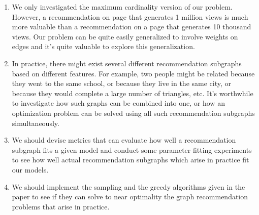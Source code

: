 \documentclass[11pt]{article}
\begin{document}
\begin{enumerate}
\item We only investigated the maximum cardinality version of our
  problem. However, a recommendation on page that generates 1 million
  views is much more valuable than a recommendation on a page that
  generates 10 thousand views. Our problem can be quite easily
  generalized to involve weights on edges and it's quite valuable
  to explore this generalization.

\item In practice, there might exist several different
  recommendation subgraphs based on different features. For example,
  two people might be related because they went to the same 
  school, or because they live in the same city, or because they
  would complete a large number of triangles, etc. It's worthwhile
  to investigate how such graphs can be combined into one, or how
  an optimization problem can be solved using all such 
  recommendation subgraphs simultaneously.

\item We should devise metrics that can evaluate how well a
  recommendation subgraph fits a given model and conduct some parameter
  fitting experiments to see how well actual recommendation subgraphs
  which arise in practice fit our models.

\item We should implement the sampling and the greedy algorithms
  given in the paper to see if they can solve to near optimality
  the graph recommendation problems that arise in practice.
\end{enumerate}

{}

\end{document}
